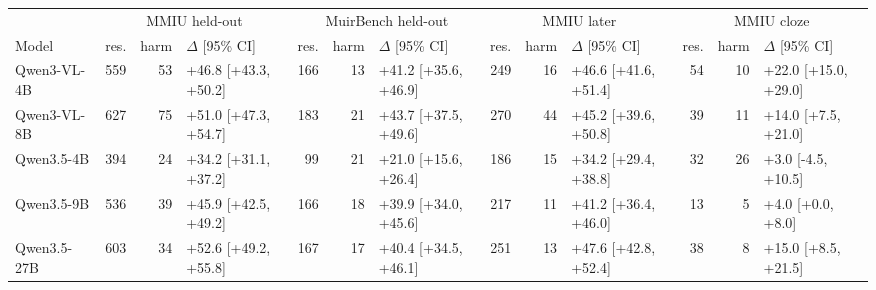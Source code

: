 \begin{tabular}{lrrlrrlrrlrrl}
\toprule
 & \multicolumn{3}{c}{MMIU held-out} & \multicolumn{3}{c}{MuirBench held-out} & \multicolumn{3}{c}{MMIU later} & \multicolumn{3}{c}{MMIU cloze} \\
\cmidrule(lr){2-4}\cmidrule(lr){5-7}\cmidrule(lr){8-10}\cmidrule(lr){11-13}
Model & res. & harm & $\Delta$ [95\% CI] & res. & harm & $\Delta$ [95\% CI] & res. & harm & $\Delta$ [95\% CI] & res. & harm & $\Delta$ [95\% CI] \\
\midrule
Qwen3-VL-4B & 559 & 53 & +46.8 [+43.3, +50.2] & 166 & 13 & +41.2 [+35.6, +46.9] & 249 & 16 & +46.6 [+41.6, +51.4] & 54 & 10 & +22.0 [+15.0, +29.0] \\
Qwen3-VL-8B & 627 & 75 & +51.0 [+47.3, +54.7] & 183 & 21 & +43.7 [+37.5, +49.6] & 270 & 44 & +45.2 [+39.6, +50.8] & 39 & 11 & +14.0 [+7.5, +21.0] \\
Qwen3.5-4B & 394 & 24 & +34.2 [+31.1, +37.2] & 99 & 21 & +21.0 [+15.6, +26.4] & 186 & 15 & +34.2 [+29.4, +38.8] & 32 & 26 & +3.0 [-4.5, +10.5] \\
Qwen3.5-9B & 536 & 39 & +45.9 [+42.5, +49.2] & 166 & 18 & +39.9 [+34.0, +45.6] & 217 & 11 & +41.2 [+36.4, +46.0] & 13 & 5 & +4.0 [+0.0, +8.0] \\
Qwen3.5-27B & 603 & 34 & +52.6 [+49.2, +55.8] & 167 & 17 & +40.4 [+34.5, +46.1] & 251 & 13 & +47.6 [+42.8, +52.4] & 38 & 8 & +15.0 [+8.5, +21.5] \\
\bottomrule
\end{tabular}
